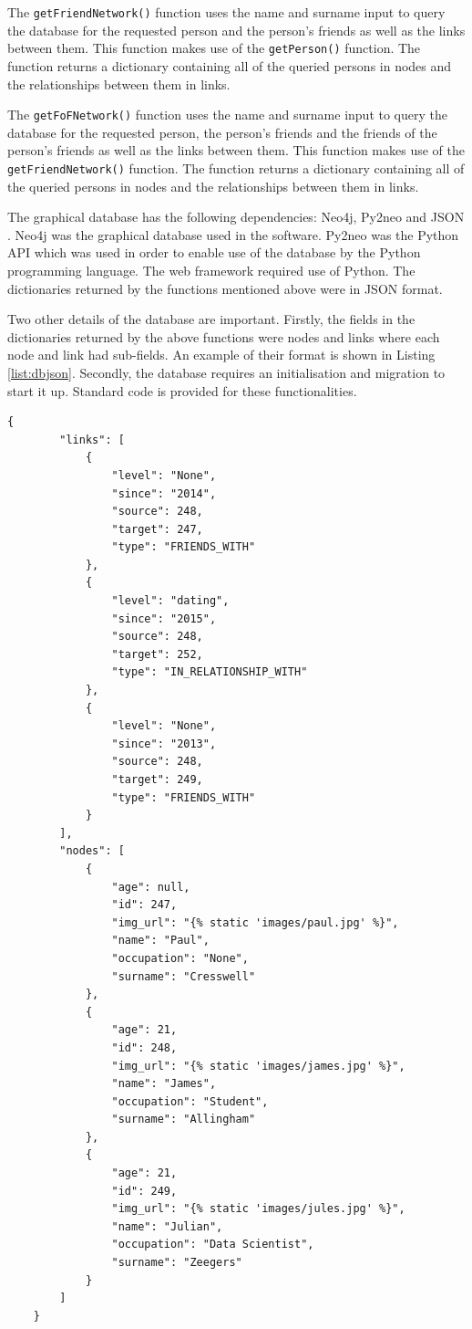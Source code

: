 \documentclass[12pt,onecolumn]{article}
\begin{document}
	The \texttt{getFriendNetwork()} function uses the name and surname input to query the database for the requested person and the person's friends as well as the links between them. This function makes use of the \texttt{getPerson()} function. The function returns a dictionary containing all of the queried persons in nodes and the relationships between them in links.
	
	The \texttt{getFoFNetwork()} function uses the name and surname input to query the database for the requested person, the person's friends and the friends of the person's friends as well as the links between them. This function makes use of the \texttt{getFriendNetwork()} function. The function returns a dictionary containing all of the queried persons in nodes and the relationships between them in links.
	
	The graphical database has the following dependencies: Neo4j, Py2neo and JSON \cite{neo4j, py2neo, JSON}. Neo4j was the graphical database used in the software. Py2neo was the Python API which was used in order to enable use of the database by the Python programming language. The web framework required use of Python. The dictionaries returned by the functions mentioned above were in JSON format.
	
	Two other details of the database are important. Firstly, the fields in the dictionaries returned by the above functions were nodes and links where each node and link had sub-fields. An example of their format is shown in Listing \ref{list:dbjson}. Secondly, the database requires an initialisation and migration to start it up. Standard code is provided for these functionalities.
	
	\begin{lstlisting}[caption=test,captionpos=b,label=list:dbjson]
	{
	    "links": [
	        {
	            "level": "None", 
	            "since": "2014", 
	            "source": 248, 
	            "target": 247, 
	            "type": "FRIENDS_WITH"
	        }, 
	        {
	            "level": "dating", 
	            "since": "2015", 
	            "source": 248, 
	            "target": 252, 
	            "type": "IN_RELATIONSHIP_WITH"
	        }, 
	        {
	            "level": "None", 
	            "since": "2013", 
	            "source": 248, 
	            "target": 249, 
	            "type": "FRIENDS_WITH"
	        }
	    ], 
	    "nodes": [
	        {
	            "age": null, 
	            "id": 247, 
	            "img_url": "{% static 'images/paul.jpg' %}", 
	            "name": "Paul", 
	            "occupation": "None", 
	            "surname": "Cresswell"
	        }, 
	        {
	            "age": 21, 
	            "id": 248, 
	            "img_url": "{% static 'images/james.jpg' %}", 
	            "name": "James", 
	            "occupation": "Student", 
	            "surname": "Allingham"
	        }, 
	        {
	            "age": 21, 
	            "id": 249, 
	            "img_url": "{% static 'images/jules.jpg' %}", 
	            "name": "Julian", 
	            "occupation": "Data Scientist", 
	            "surname": "Zeegers"
	        }
	    ]
	}

	\end{lstlisting} 
	
\end{document}
